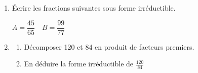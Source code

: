 \documentclass[a4paper]{book}
\begin{document}
    \begin{exemple}
        \begin{enumerate}
            \item Écrire les fractions suivantes sous forme irréductible.

            $A=\dfrac{45}{65} \quad B=\dfrac{99}{77}$

            \vspace{1cm}

            \item \begin{enumerate}
                \item Décomposer 120 et 84 en produit de facteurs premiers.

                \vspace{1cm}

                \item En déduire la forme irréductible de $\frac{120}{84 }$
            \end{enumerate}
        \end{enumerate}     
    \end{exemple}
\end{document}
